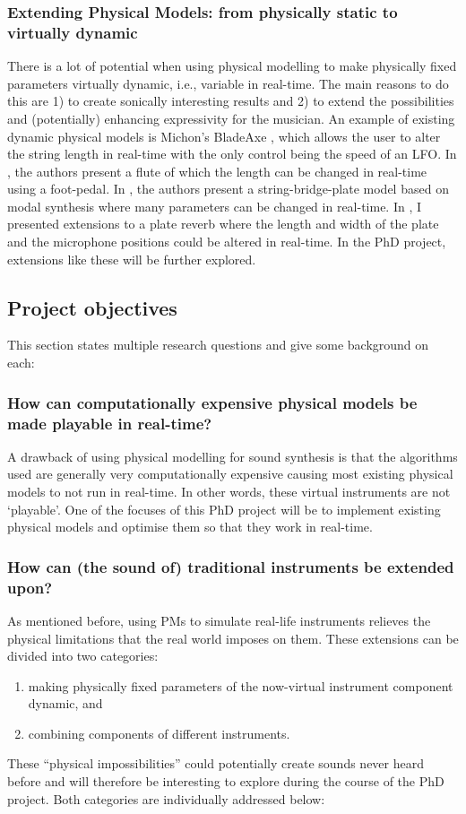 \subsubsection*{Extending Physical Models: from physically static to virtually dynamic}
There is a lot of potential when using physical modelling to make physically fixed parameters virtually dynamic, i.e., variable in real-time. The main reasons to do this are 1) to create sonically interesting results and 2) to extend the possibilities and (potentially) enhancing expressivity for the musician.
An example of existing dynamic physical models is Michon’s BladeAxe \cite{Michon2016}, which allows the user to alter the string length in real-time with the only control being the speed of an LFO. In \cite{Gelineck2005}, the authors present a flute of which the length can be changed in real-time using a foot-pedal. In \cite{Walstijn2017}, the authors present a string-bridge-plate model based on modal synthesis where many parameters can be changed in real-time. In \cite{Willemsen2017}, I presented extensions to a plate reverb where the length and width of the plate and the microphone positions could be altered in real-time. In the PhD project, extensions like these will be further explored.

\subsection{Project objectives}
This section states multiple research questions and give some background on each:
\subsubsection*{How can computationally expensive physical models be made playable in real-time?}
A drawback of using physical modelling for sound synthesis is that the algorithms used are generally very computationally expensive causing most existing physical models to not run in real-time. In other words, these virtual instruments are not ‘playable’. One of the focuses of this PhD project will be to implement existing physical models and optimise them so that they work in real-time. 

\subsubsection*{How can (the sound of) traditional instruments be extended upon?}
As mentioned before, using PMs to simulate real-life instruments relieves the physical limitations that the real world imposes on them. These extensions can be divided into two categories: 
\begin{enumerate}
    \item making physically fixed parameters of the now-virtual instrument component dynamic, and
    \item combining components of different instruments.
\end{enumerate}
These ``physical impossibilities'' could potentially create sounds never heard before and will therefore be interesting to explore during the course of the PhD project. Both categories are individually addressed below:
\\

